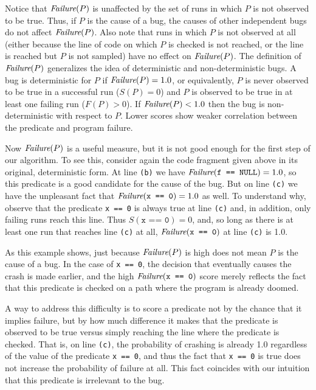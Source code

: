 Notice that $\textit{Failure}(P)$ is unaffected by the set of runs in which
$P$ is not observed to be true.  Thus, if $P$ is the cause of a bug, the
causes of other independent bugs do not affect $\textit{Failure}(P)$.
Also note that runs in which $P$ is not observed at all (either because
the line of code on which $P$ is checked is not reached, or the line is reached
but $P$ is not sampled) have no effect on $\textit{Failure}(P)$.
The definition of $\textit{Failure}(P)$
generalizes the idea of deterministic and non-deterministic bugs.  A
bug is deterministic for $P$ if $\textit{Failure}(P) = 1.0$, or equivalently,
$P$ is never observed to be true in a successful run ($S(P) =
0$) and $P$ is observed to be true in at least one failing run ($F(P) > 0$).
If $\textit{Failure}(P) < 1.0$ then the bug is non-deterministic with respect to $P$.
Lower scores show weaker correlation between the predicate and
program failure.

Now $\textit{Failure}(P)$ is a useful measure, but it is not good
enough for the first step of our algorithm. To see this, consider again the
code fragment given above in its original, deterministic form.  At line \texttt{(b)} we
have $\textit{Failure}(\texttt{f == NULL}) = 1.0$, so this predicate is a good
candidate for the cause of the bug.
But on line \texttt{(c)} we have the unpleasant fact that $\textit{Failure}(\texttt{x == 0}) = 1.0$ as well.
To understand why, observe that the
predicate \texttt{x == 0} is always true at line \texttt{(c)} and, in
addition,
only failing runs reach this line.
Thus $S(\texttt{x == 0}) = 0$, and, so long as there is at least one run that
reaches line \texttt{(c)} at all, $\textit{Failure}(\texttt{x == 0})$ at line \texttt{(c)} is 1.0.

As this example
shows, just because $\textit{Failure}(P)$ is high does not
mean $P$ is the cause of a bug.  In the case of \texttt{x == 0}, the
decision that eventually causes the crash is made earlier, and the
high $\textit{Failure}(\texttt{x == 0})$ score merely reflects the fact that this
predicate is checked on a path where the program is already doomed.

A way to address this difficulty is to score a predicate not by the
chance that it implies failure, but by how much difference it makes
that the predicate is observed to be true versus simply reaching the
line where the predicate is checked.  That is, on line \texttt{(c)},
the probability of crashing is already 1.0 regardless of the value of
the predicate \texttt{x == 0}, and thus the fact that \texttt{x == 0}
is true does not increase the probability of failure at all.  This
fact coincides with our intuition that this predicate is irrelevant to
the bug.


